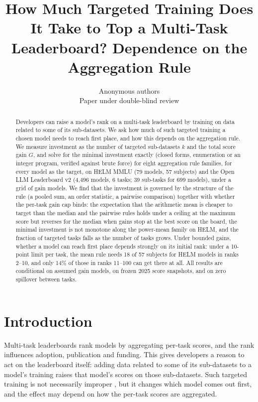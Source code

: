 \documentclass{article}
\title{How Much Targeted Training Does It Take to Top a Multi-Task Leaderboard? Dependence on the Aggregation Rule}
\author{Anonymous authors \\ Paper under double-blind review}
\begin{document}
\maketitle
\begin{abstract}
Developers can raise a model's rank on a multi-task leaderboard by training on data related to some of its sub-datasets.
We ask how much of such targeted training a chosen model needs to reach first place, and how this depends on the aggregation rule.
We measure investment as the number of targeted sub-datasets $k$ and the total score gain $G$, and solve for the minimal investment exactly (closed forms, enumeration or an integer program, verified against brute force) for eight aggregation rule families, for every model as the target, on HELM MMLU (79 models, 57 subjects) and the Open LLM Leaderboard v2 (4{,}496 models, 6 tasks; 39 sub-tasks for 699 models), under a grid of gain models.
We find that the investment is governed by the structure of the rule (a pooled sum, an order statistic, a pairwise comparison) together with whether the per-task gain cap binds: the expectation that the arithmetic mean is cheaper to target than the median and the pairwise rules holds under a ceiling at the maximum score but reverses for the median when gains stop at the best score on the board, the minimal investment is not monotone along the power-mean family on HELM, and the fraction of targeted tasks falls as the number of tasks grows.
Under bounded gains, whether a model can reach first place depends strongly on its initial rank: under a 10-point limit per task, the mean rule needs 18 of 57 subjects for HELM models in ranks 2--10, and only 14\% of those in ranks 11--100 can get there at all.
All results are conditional on assumed gain models, on frozen 2025 score snapshots, and on zero spillover between tasks.
\end{abstract}

\section{Introduction}
Multi-task leaderboards rank models by aggregating per-task scores, and the rank influences adoption, publication and funding. This gives developers a reason to act on the leaderboard itself: adding data related to some of its sub-datasets to a model's training raises that model's scores on those sub-datasets. Such targeted training is not necessarily improper \citep{dominguez2024testtask}, but it changes which model comes out first, and the effect may depend on how the per-task scores are aggregated.
\end{document}

